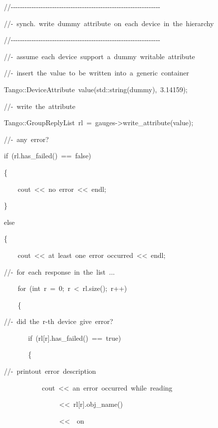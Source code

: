 
\begin{lyxcode}
//-{}-{}-{}-{}-{}-{}-{}-{}-{}-{}-{}-{}-{}-{}-{}-{}-{}-{}-{}-{}-{}-{}-{}-{}-{}-{}-{}-{}-{}-{}-{}-{}-{}-{}-{}-{}-{}-{}-{}-{}-{}-{}-{}-{}-{}-{}-{}-{}-{}-{}-{}-{}-{}-{}-{}-{}-{}-{}-{}-{}-{}-{}-{}-{}-

//-~synch.~write~\textquotedbl{}dummy\textquotedbl{}~attribute~on~each~device~in~the~hierarchy

//-{}-{}-{}-{}-{}-{}-{}-{}-{}-{}-{}-{}-{}-{}-{}-{}-{}-{}-{}-{}-{}-{}-{}-{}-{}-{}-{}-{}-{}-{}-{}-{}-{}-{}-{}-{}-{}-{}-{}-{}-{}-{}-{}-{}-{}-{}-{}-{}-{}-{}-{}-{}-{}-{}-{}-{}-{}-{}-{}-{}-{}-{}-{}-{}-

//-~assume~each~device~support~a~\textquotedbl{}dummy\textquotedbl{}~writable~attribute

//-~insert~the~value~to~be~written~into~a~generic~container

Tango::DeviceAttribute~value(std::string(\textquotedbl{}dummy\textquotedbl{}),~3.14159);

//-~write~the~attribute

Tango::GroupReplyList~rl~=~gauges->write\_attribute(value);

//-~any~error?

if~(rl.has\_failed()~==~false)

\{

~~~~cout~<\textcompwordmark{}<~\textquotedbl{}no~error\textquotedbl{}~<\textcompwordmark{}<~endl;

\}

else

\{

~~~~cout~<\textcompwordmark{}<~\textquotedbl{}at~least~one~error~occurred\textquotedbl{}~<\textcompwordmark{}<~endl;

//-~for~each~response~in~the~list~...

~~~~for~(int~r~=~0;~r~<~rl.size();~r++)

~~~~\{

//-~did~the~r-th~device~give~error?

~~~~~~~if~(rl{[}r{]}.has\_failed()~==~true)

~~~~~~~\{

//-~printout~error~description

~~~~~~~~~~~cout~<\textcompwordmark{}<~\textquotedbl{}an~error~occurred~while~reading~\textquotedbl{}~

~~~~~~~~~~~~~~~~<\textcompwordmark{}<~rl{[}r{]}.obj\_name()

~~~~~~~~~~~~~~~~<\textcompwordmark{}<~\textquotedbl{}~on~\textquotedbl{}


\end{lyxcode}
